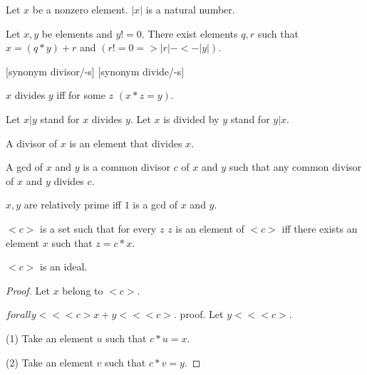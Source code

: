 \documentclass{article}
\begin{document}
\begin{forthel}
    \begin{signature}[EucSort]
      Let $x$ be a nonzero element. $|x|$ is a natural number.
    \end{signature}

    \begin{axiom}[Division]
      Let $x,y$ be elements and $y != 0$. There exist elements $q,r$ such that $x = (q * y) + r$ and $(r != 0 => |r| -<- |y|)$.
    \end{axiom}


    [synonym divisor/-s] [synonym divide/-s]

    \begin{definition}[DefDiv]
      $x$ divides $y$ iff for some $z$ $(x * z = y)$.
    \end{definition}

    Let $x | y$ stand for $x$ divides $y$.
    Let $x$ is divided by $y$ stand for $y | x$.

    \begin{definition}[DefDvs]
      A divisor of $x$ is an element that divides $x$.
    \end{definition}

    \begin{definition}[DefGCD]
      A gcd of $x$ and $y$ is a common divisor $c$ of $x$ and $y$ such that any common divisor of $x$ and $y$ divides $c$.
    \end{definition}

    \begin{definition}[DefRel]
      $x,y$ are relatively prime iff $1$ is a gcd of $x$ and $y$.
    \end{definition}


    \begin{definition}[DefPrIdeal]
      $<c>$ is a set such that for every $z$ $z$ is an element of $<c>$ iff there exists an element $x$ such that $z = c * x$.
    \end{definition}

    \begin{lemma}[PrIdeal]
      $<c>$ is an ideal.
    \end{lemma}
    \begin{proof}
      Let $x$ belong to $<c>$.

      $forall y << <c> x + y << <c>$.
      proof.
        Let $y << <c>$.

        (1) Take an element $u$ such that $c * u = x$.

        (2) Take an element $v$ such that $c * v = y$.


\end{proof}
\end{forthel}
\end{document}
